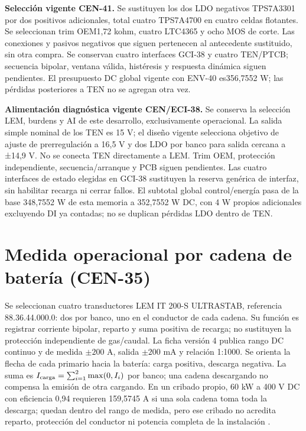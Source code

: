 \textbf{Selección vigente CEN-41.} Se sustituyen los dos LDO negativos TPS7A3301 por dos positivos adicionales, total cuatro TPS7A4700 en cuatro celdas flotantes. Se seleccionan trim OEM1,72 kohm, cuatro LTC4365 y ocho MOS de corte. Las conexiones y pasivos negativos que siguen pertenecen al antecedente sustituido, sin otra compra. Se conservan cuatro interfaces GCI-38 y cuatro TEN/PTCB; secuencia bipolar, ventana válida, histéresis y respuesta dinámica siguen pendientes. El presupuesto DC global vigente con ENV-40 es356,7552 W; las pérdidas posteriores a TEN no se agregan otra vez.

\textbf{Alimentación diagnóstica vigente CEN/ECI-38.} Se conserva la selección LEM, burdens y AI de este desarrollo, exclusivamente operacional. La salida simple nominal de los TEN es 15 V; el diseño vigente selecciona objetivo de ajuste de prerregulación a 16,5 V y dos LDO por banco para salida cercana a ±14,9 V. No se conecta TEN directamente a LEM. Trim OEM, protección independiente, secuencia/arranque y PCB siguen pendientes. Las cuatro interfaces de estado elegidas en GCI-38 sustituyen la reserva genérica de interfaz, sin habilitar recarga ni cerrar fallos. El subtotal global control/energía pasa de la base 348,7552 W de esta memoria a 352,7552 W DC, con 4 W propios adicionales excluyendo DI ya contadas; no se duplican pérdidas LDO dentro de TEN.

\section{Medida operacional por cadena de batería (CEN-35)}
\label{sec:sd4-medida-cen35}
Se seleccionan cuatro transductores LEM IT 200-S ULTRASTAB, referencia 88.36.44.000.0: dos por banco, uno en el conductor de cada cadena. Su función es registrar corriente bipolar, reparto y suma positiva de recarga; no sustituyen la protección independiente de gas/caudal. La ficha versión 4 publica rango DC continuo y de medida $\pm200$ A, salida $\pm200$ mA y relación 1:1000. Se orienta la flecha de cada primario hacia la batería: carga positiva, descarga negativa. La suma es $I_{\rm carga}=\sum_{i=1}^{2}\max(0,I_i)$ por banco; una cadena descargando no compensa la emisión de otra cargando. En un cribado propio, 60 kW a 400 V DC con eficiencia 0,94 requieren 159,5745 A si una sola cadena toma toda la descarga; quedan dentro del rango de medida, pero ese cribado no acredita reparto, protección del conductor ni potencia completa de la instalación \parencite[pp.~1, 5 y 10]{lote35-lem200}.

